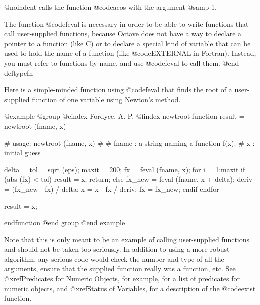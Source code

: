 @noindent
calls the function @code{acos} with the argument @samp{-1}.

The function @code{feval} is necessary in order to be able to write
functions that call user-supplied functions, because Octave does not
have a way to declare a pointer to a function (like C) or to declare a
special kind of variable that can be used to hold the name of a function
(like @code{EXTERNAL} in Fortran).  Instead, you must refer to functions
by name, and use @code{feval} to call them.
@end deftypefn

Here is a simple-minded function using @code{feval} that finds the root
of a user-supplied function of one variable using Newton's method.

@example
@group
@cindex Fordyce, A. P.
@findex newtroot
function result = newtroot (fname, x)

# usage: newtroot (fname, x)
#
#   fname : a string naming a function f(x).
#   x     : initial guess

  delta = tol = sqrt (eps);
  maxit = 200;
  fx = feval (fname, x);
  for i = 1:maxit
    if (abs (fx) < tol)
      result = x;
      return;
    else
      fx_new = feval (fname, x + delta);
      deriv = (fx_new - fx) / delta;
      x = x - fx / deriv;
      fx = fx_new;
    endif
  endfor

  result = x;

endfunction
@end group
@end example

Note that this is only meant to be an example of calling user-supplied
functions and should not be taken too seriously.  In addition to using a
more robust algorithm, any serious code would check the number and type
of all the arguments, ensure that the supplied function really was a
function, etc.  See @xref{Predicates for Numeric Objects}, for example,
for a list of predicates for numeric objects, and @xref{Status of
Variables}, for a description of the @code{exist} function.
